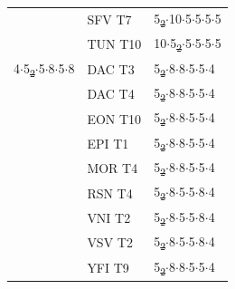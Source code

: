 \documentclass[preprint,numrefs,noinfo,sort&compress]{elsarticle}
\providecommand{\DIFadd}[1]{{\protect\color{blue}\uwave{#1}}} %
\providecommand{\DIFdel}[1]{{\protect\color{red}\sout{#1}}}                      %
\providecommand{\DIFaddFL}[1]{\DIFadd{#1}} %
\providecommand{\DIFdelFL}[1]{\DIFdel{#1}} %
\providecommand{\DIFaddbeginFL}{} %
\providecommand{\DIFaddendFL}{} %
\providecommand{\DIFdelbeginFL}{} %
\providecommand{\DIFdelendFL}{} %
\newcommand{\DIFscaledelfig}{0.5}
\newlength{\DIFdelgraphicswidth} %
\newlength{\DIFdelgraphicsheight} %
\newcommand{\DIFaddincludegraphics}[2][]{{\color{blue}\fbox{\DIFOincludegraphics[#1]{#2}}}} %
\newcommand{\DIFdelincludegraphics}[2][]{%
\sbox{\DIFdelgraphicsbox}{\DIFOincludegraphics[#1]{#2}}%
\settoboxwidth{\DIFdelgraphicswidth}{\DIFdelgraphicsbox} %
\settoboxtotalheight{\DIFdelgraphicsheight}{\DIFdelgraphicsbox} %
\scalebox{\DIFscaledelfig}{%
\parbox[b]{\DIFdelgraphicswidth}{\usebox{\DIFdelgraphicsbox}\\[-\baselineskip] \rule{\DIFdelgraphicswidth}{0em}}\llap{\resizebox{\DIFdelgraphicswidth}{\DIFdelgraphicsheight}{%
\setlength{\unitlength}{\DIFdelgraphicswidth}%
\begin{picture}(1,1)%
\thicklines\linethickness{2pt} %
{\color[rgb]{1,0,0}\put(0,0){\framebox(1,1){}}}%
{\color[rgb]{1,0,0}\put(0,0){\line( 1,1){1}}}%
{\color[rgb]{1,0,0}\put(0,1){\line(1,-1){1}}}%
\end{picture}%
}\hspace*{3pt}}} %
} %
\DeclareRobustCommand{\DIFaddbeginFL}{\DIFOaddbeginFL \let\includegraphics\DIFaddincludegraphics} %
\DeclareRobustCommand{\DIFaddendFL}{\DIFOaddendFL \let\includegraphics\DIFOincludegraphics} %
\DeclareRobustCommand{\DIFdelbeginFL}{\DIFOdelbeginFL \let\includegraphics\DIFdelincludegraphics} %
\DeclareRobustCommand{\DIFdelendFL}{\DIFOaddendFL \let\includegraphics\DIFOincludegraphics} %
\begin{document}
\begin{table}
\begin{threeparttable}
{\begin{tabular}{lll}
 & SFV T7 & 5\DIFdelbeginFL \DIFdelFL{\textsubscript{2}\(\cdot\)}\DIFdelendFL \DIFaddbeginFL \DIFaddFL{\(_{\text{2}} \cdot\)}\DIFaddendFL 10\(\cdot\)5\(\cdot\)5\(\cdot\)5\(\cdot\)5\\
 & TUN T10 & 10\(\cdot\)5\DIFdelbeginFL \DIFdelFL{\textsubscript{2}\(\cdot\)}\DIFdelendFL \DIFaddbeginFL \DIFaddFL{\(_{\text{2}} \cdot\)}\DIFaddendFL 5\(\cdot\)5\(\cdot\)5\(\cdot\)5\\
\hline
4\(\cdot\)5\DIFdelbeginFL \DIFdelFL{\textsubscript{2}\(\cdot\)}\DIFdelendFL \DIFaddbeginFL \DIFaddFL{\(_{\text{2}} \cdot\)}\DIFaddendFL 5\(\cdot\)8\(\cdot\)5\(\cdot\)8 & DAC T3 & 5\DIFdelbeginFL \DIFdelFL{\textsubscript{2}\(\cdot\)}\DIFdelendFL \DIFaddbeginFL \DIFaddFL{\(_{\text{2}} \cdot\)}\DIFaddendFL 8\(\cdot\)8\(\cdot\)5\(\cdot\)5\(\cdot\)4\\
 & DAC T4 & 5\DIFdelbeginFL \DIFdelFL{\textsubscript{2}\(\cdot\)}\DIFdelendFL \DIFaddbeginFL \DIFaddFL{\(_{\text{2}} \cdot\)}\DIFaddendFL 8\(\cdot\)8\(\cdot\)5\(\cdot\)5\(\cdot\)4\\
 & EON T10 & 5\DIFdelbeginFL \DIFdelFL{\textsubscript{2}\(\cdot\)}\DIFdelendFL \DIFaddbeginFL \DIFaddFL{\(_{\text{2}} \cdot\)}\DIFaddendFL 8\(\cdot\)8\(\cdot\)5\(\cdot\)5\(\cdot\)4\\
 & EPI T1 & 5\DIFdelbeginFL \DIFdelFL{\textsubscript{2}\(\cdot\)}\DIFdelendFL \DIFaddbeginFL \DIFaddFL{\(_{\text{2}} \cdot\)}\DIFaddendFL 8\(\cdot\)8\(\cdot\)5\(\cdot\)5\(\cdot\)4\\
 & MOR T4 & 5\DIFdelbeginFL \DIFdelFL{\textsubscript{2}\(\cdot\)}\DIFdelendFL \DIFaddbeginFL \DIFaddFL{\(_{\text{2}} \cdot\)}\DIFaddendFL 8\(\cdot\)8\(\cdot\)5\(\cdot\)5\(\cdot\)4\\
 & RSN T4 & 5\DIFdelbeginFL \DIFdelFL{\textsubscript{2}\(\cdot\)}\DIFdelendFL \DIFaddbeginFL \DIFaddFL{\(_{\text{2}} \cdot\)}\DIFaddendFL 8\(\cdot\)5\(\cdot\)5\(\cdot\)8\(\cdot\)4\\
 & VNI T2 & 5\DIFdelbeginFL \DIFdelFL{\textsubscript{2}\(\cdot\)}\DIFdelendFL \DIFaddbeginFL \DIFaddFL{\(_{\text{2}} \cdot\)}\DIFaddendFL 8\(\cdot\)5\(\cdot\)5\(\cdot\)8\(\cdot\)4\\
 & VSV T2 & 5\DIFdelbeginFL \DIFdelFL{\textsubscript{2}\(\cdot\)}\DIFdelendFL \DIFaddbeginFL \DIFaddFL{\(_{\text{2}} \cdot\)}\DIFaddendFL 8\(\cdot\)5\(\cdot\)5\(\cdot\)8\(\cdot\)4\\
 & YFI T9 & 5\DIFdelbeginFL \DIFdelFL{\textsubscript{2}\(\cdot\)}\DIFdelendFL \DIFaddbeginFL \DIFaddFL{\(_{\text{2}} \cdot\)}\DIFaddendFL 8\(\cdot\)8\(\cdot\)5\(\cdot\)5\(\cdot\)4\\

\end{tabular}}
\end{threeparttable}
\end{table}
\end{document}
